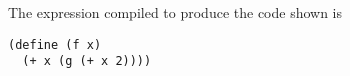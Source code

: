 \documentclass[a4paper,12pt]{article}
\begin{document}
The expression compiled to produce the code shown is
\begin{lstlisting}
(define (f x)
  (+ x (g (+ x 2))))
\end{lstlisting}
\end{document}

